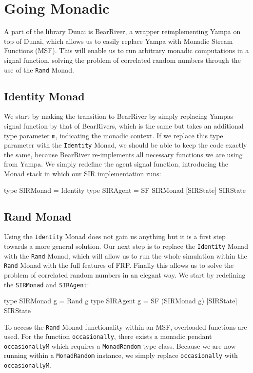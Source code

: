\section{Going Monadic}
\label{sec:timedriven_monadic}
A part of the library Dunai is BearRiver, a wrapper reimplementing Yampa on top of Dunai, which allows us to easily replace Yampa with Monadic Stream Functions (MSF). This will enable us to run arbitrary monadic computations in a signal function, solving the problem of correlated random numbers through the use of the \texttt{Rand} Monad.

\subsection{Identity Monad}
We start by making the transition to BearRiver by simply replacing Yampas signal function by that of BearRivers, which is the same but takes an additional type parameter \texttt{m}, indicating the monadic context. If we replace this type parameter with the \texttt{Identity} Monad, we should be able to keep the code exactly the same, because BearRiver re-implements all necessary functions we are using from Yampa. We simply redefine the agent signal function, introducing the Monad stack in which our SIR implementation runs:

\begin{HaskellCode}
type SIRMonad = Identity
type SIRAgent = SF SIRMonad [SIRState] SIRState
\end{HaskellCode}

\subsection{Rand Monad}
Using the \texttt{Identity} Monad does not gain us anything but it is a first step towards a more general solution. Our next step is to replace the \texttt{Identity} Monad with the \texttt{Rand} Monad, which will allow us to run the whole simulation within the \texttt{Rand} Monad with the full features of FRP. Finally this allows us to solve the problem of correlated random numbers in an elegant way. We start by redefining the \texttt{SIRMonad} and \texttt{SIRAgent}:

\begin{HaskellCode}
type SIRMonad g = Rand g
type SIRAgent g = SF (SIRMonad g) [SIRState] SIRState
\end{HaskellCode}

To access the \texttt{Rand} Monad functionality within an MSF, overloaded functions are used. For the function \texttt{occasionally}, there exists a monadic pendant \texttt{occasionallyM} which requires a \texttt{MonadRandom} type class. Because we are now running within a \texttt{MonadRandom} instance, we simply replace \texttt{occasionally} with \texttt{occasionallyM}. 

